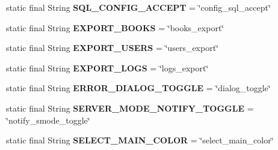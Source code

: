 \begin{DoxyCompactItemize}
\item 
\hypertarget{classw3se_1_1_controller_1_1_config_view_controller_abf4dc0d00e20c69b4e0118fb8d74477d}{static final String {\bfseries S\-Q\-L\-\_\-\-C\-O\-N\-F\-I\-G\-\_\-\-A\-C\-C\-E\-P\-T} = \char`\"{}config\-\_\-sql\-\_\-accept\char`\"{}}\label{classw3se_1_1_controller_1_1_config_view_controller_abf4dc0d00e20c69b4e0118fb8d74477d}

\item 
\hypertarget{classw3se_1_1_controller_1_1_config_view_controller_a2c7c6799052137adfee0591f185401f7}{static final String {\bfseries E\-X\-P\-O\-R\-T\-\_\-\-B\-O\-O\-K\-S} = \char`\"{}books\-\_\-export\char`\"{}}\label{classw3se_1_1_controller_1_1_config_view_controller_a2c7c6799052137adfee0591f185401f7}

\item 
\hypertarget{classw3se_1_1_controller_1_1_config_view_controller_a4e4bd869a0653f887412d8a85f7a3179}{static final String {\bfseries E\-X\-P\-O\-R\-T\-\_\-\-U\-S\-E\-R\-S} = \char`\"{}users\-\_\-export\char`\"{}}\label{classw3se_1_1_controller_1_1_config_view_controller_a4e4bd869a0653f887412d8a85f7a3179}

\item 
\hypertarget{classw3se_1_1_controller_1_1_config_view_controller_ac83cfe79c7fe26dbd5da75a6090c87fe}{static final String {\bfseries E\-X\-P\-O\-R\-T\-\_\-\-L\-O\-G\-S} = \char`\"{}logs\-\_\-export\char`\"{}}\label{classw3se_1_1_controller_1_1_config_view_controller_ac83cfe79c7fe26dbd5da75a6090c87fe}

\item 
\hypertarget{classw3se_1_1_controller_1_1_config_view_controller_a8e087abf8dbae2852722f5ec7417a6bb}{static final String {\bfseries E\-R\-R\-O\-R\-\_\-\-D\-I\-A\-L\-O\-G\-\_\-\-T\-O\-G\-G\-L\-E} = \char`\"{}dialog\-\_\-toggle\char`\"{}}\label{classw3se_1_1_controller_1_1_config_view_controller_a8e087abf8dbae2852722f5ec7417a6bb}

\item 
\hypertarget{classw3se_1_1_controller_1_1_config_view_controller_af0a4f7f8256aa697f47d4a2fb358ae85}{static final String {\bfseries S\-E\-R\-V\-E\-R\-\_\-\-M\-O\-D\-E\-\_\-\-N\-O\-T\-I\-F\-Y\-\_\-\-T\-O\-G\-G\-L\-E} = \char`\"{}notify\-\_\-smode\-\_\-toggle\char`\"{}}\label{classw3se_1_1_controller_1_1_config_view_controller_af0a4f7f8256aa697f47d4a2fb358ae85}

\item 
\hypertarget{classw3se_1_1_controller_1_1_config_view_controller_a02da0a1fe5042f208afbc27e3ecb3f86}{static final String {\bfseries S\-E\-L\-E\-C\-T\-\_\-\-M\-A\-I\-N\-\_\-\-C\-O\-L\-O\-R} = \char`\"{}select\-\_\-main\-\_\-color\char`\"{}}\label{classw3se_1_1_controller_1_1_config_view_controller_a02da0a1fe5042f208afbc27e3ecb3f86}


\end{DoxyCompactItemize}

